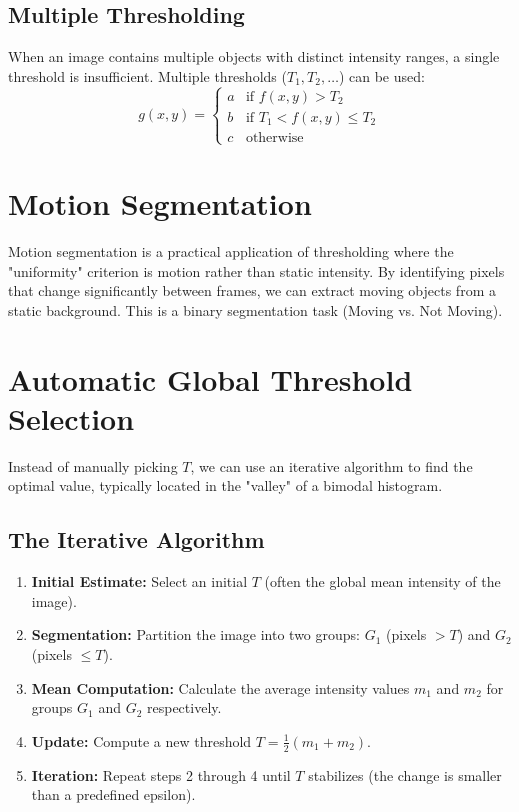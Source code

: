 \documentclass{report}
\begin{document}
\subsection{Multiple Thresholding}
When an image contains multiple objects with distinct intensity ranges, a single threshold is insufficient. Multiple thresholds ($T_1, T_2, \dots$) can be used:
\begin{equation}
    g(x,y) = \begin{cases} a & \text{if } f(x,y) > T_2 \\ b & \text{if } T_1 < f(x,y) \le T_2 \\ c & \text{otherwise} \end{cases}
\end{equation}

\section{Motion Segmentation}
Motion segmentation is a practical application of thresholding where the "uniformity" criterion is motion rather than static intensity. By identifying pixels that change significantly between frames, we can extract moving objects from a static background. This is a binary segmentation task (Moving vs. Not Moving).

\section{Automatic Global Threshold Selection}
Instead of manually picking $T$, we can use an iterative algorithm to find the optimal value, typically located in the "valley" of a bimodal histogram.

\subsection{The Iterative Algorithm}
\begin{enumerate}
    \item \textbf{Initial Estimate:} Select an initial $T$ (often the global mean intensity of the image).
    \item \textbf{Segmentation:} Partition the image into two groups: $G_1$ (pixels $> T$) and $G_2$ (pixels $\le T$).
    \item \textbf{Mean Computation:} Calculate the average intensity values $m_1$ and $m_2$ for groups $G_1$ and $G_2$ respectively.
    \item \textbf{Update:} Compute a new threshold $T = \frac{1}{2}(m_1 + m_2)$.
    \item \textbf{Iteration:} Repeat steps 2 through 4 until $T$ stabilizes (the change is smaller than a predefined epsilon).
\end{enumerate}
\end{document}
